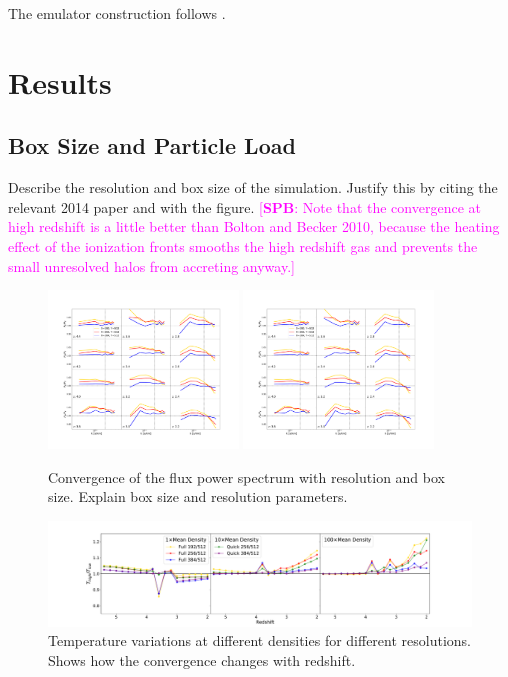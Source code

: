 \documentclass[a4paper,11pt]{article}
\newcommand{\spb}[1]{{\textcolor{magenta}{[{\bf SPB}: #1]}}}
\begin{document}
The emulator construction follows \cite{Bird:2019}.

\section{Results}

\subsection{Box Size and Particle Load}
\label{sec:boxsize}

Describe the resolution and box size of the simulation. Justify this by citing the relevant 2014 paper and with the figure. \spb{Note that the convergence at high redshift is a little better than Bolton and Becker 2010, because the heating effect of the ionization fronts smooths the high redshift gas and prevents the small unresolved halos from accreting anyway.}

\begin{figure}
\includegraphics[width=0.45\textwidth]{figures/fps_mfr.pdf}
\includegraphics[width=0.45\textwidth]{figures/fps_mfr.pdf}
 \caption{Convergence of the flux power spectrum with resolution and box size. Explain box size and resolution parameters.}
 \label{fig:resolution}
\end{figure}


\begin{figure}
\includegraphics[width=1.\textwidth]{figures/comp-temps_fq.pdf}
 \caption{Temperature variations at different densities for different resolutions. Shows how the convergence changes with redshift.}
 \label{fig:resolutiontemp}
\end{figure}
\end{document}
